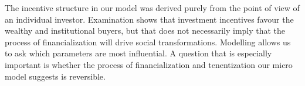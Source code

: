 The incentive structure in our model was derived purely from the point of view of an individual investor. Examination shows that investment incentives favour the wealthy and institutional buyers, but that does not necessarily imply that the process of financialization will drive social transformations. %
Modelling  allows us to ask %
which parameters are most influential. 
A question that is especially important is whether the process of financialization and tenentization our micro model suggests is reversible.%
















